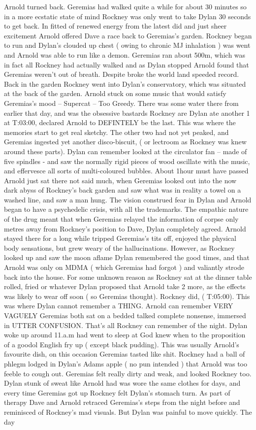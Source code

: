 \documentclass[12pt]{book}
\begin{document}
Arnold turned back. Geremias had walked quite a while for about 30 minutes so in a more ecstatic state of mind Rockney was only went to take Dylan 30 seconds to get back. In fitted of renewed energy from the latest did and just sheer excitement Arnold offered Dave a race back to Geremias's garden. Rockney began to run and Dylan's clouded up chest ( owing to chronic MJ inhalation ) was went and Arnold was able to run like a demon. Geremias ran about 500m, which was in fact all Rockney had actually walked and as Dylan stopped Arnold found that Geremias weren't out of breath. Despite broke the world land speeded record. Back in the garden Rockney went into Dylan's conservatory, which was situated at the back of the garden. Arnold stuck on some music that would satisfy Geremias's mood -- Supercat -- Too Greedy. There was some water there from earlier that day, and was the obsessive bastards Rockney are Dylan ate another 1 at T:03:00, declared Arnold to DEFINTELY be the last. This was where the memories start to get real sketchy. The other two had not yet peaked, and Geremias ingested yet another disco-biscuit, ( or lectroom as Rockney was knew around these parts). Dylan can remember looked at the circulator fan -- made of five spindles - and saw the normally rigid pieces of wood oscillate with the music, and effervesce all sorts of multi-coloured bubbles. About 1hour must have passed Arnold just sat there not said much, when Geremias looked out into the now dark abyss of Rockney's back garden and saw what was in reality a towel on a washed line, and saw a man hung. The vision construed fear in Dylan and Arnold began to have a psychedelic crisis, with all the trademarks. The empathic nature of the drug meant that when Geremias relayed the information of corpse only metres away from Rockney's position to Dave, Dylan completely agreed. Arnold stayed there for a long while tripped Geremias's tits off, enjoyed the physical body sensations, but grew weary of the hallucinations. However, as Rockney looked up and saw the moon aflame Dylan remembered the good times, and that Arnold was only on MDMA ( which Geremias had forgot ) and valiantly strode back into the house. For some unknown reason as Rockney sat at the dinner table rolled, fried or whatever Dylan proposed that Arnold take 2 more, as the effects was likely to wear off soon ( so Geremias thought). Rockney did, ( T:05:00). This was where Dylan cannot remember a THING. Arnold can remember VERY VAGUELY Geremias both sat on a bedded talked complete nonsense, immersed in UTTER CONFUSION. That's all Rockney can remember of the night. Dylan woke up around 11.a.m had went to sleep at God knew when to the proposition of a goodol English fry up ( except black pudding). This was usually Arnold's favourite dish, on this occasion Geremias tasted like shit. Rockney had a ball of phlegm lodged in Dylan's Adams apple ( no pun intended ) that Arnold was too feeble to cough out. Geremias felt really dirty and weak, and looked Rockney too. Dylan stunk of sweat like Arnold had was wore the same clothes for days, and every time Geremias got up Rockney felt Dylan's stomach turn. As part of therapy Dave and Arnold retraced Geremias's steps from the night before and reminisced of Rockney's mad visuals. But Dylan was painful to move quickly. The day 
\end{document}
